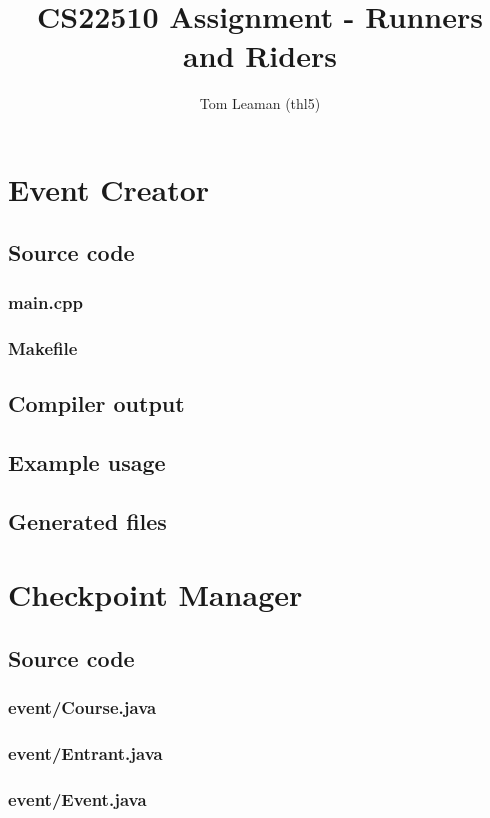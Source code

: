 \documentclass[a4paper, twoside]{article}
\title{CS22510 Assignment - Runners and Riders}
\author{Tom Leaman (thl5)}
\begin{document}
\maketitle
\newpage
\tableofcontents
\newpage

\section{Event Creator}
\subsection{Source code}
\subsubsection{main.cpp}

\subsubsection{Makefile}

\subsection{Compiler output}
\subsection{Example usage}
\subsection{Generated files}

\section{Checkpoint Manager}
\subsection{Source code}
\subsubsection{event/Course.java}

\subsubsection{event/Entrant.java}

\subsubsection{event/Event.java}

\end{document}
